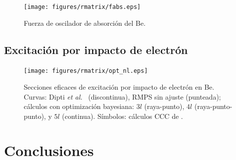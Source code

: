 \begin{figure}
\centering
\texttt{[image: figures/rmatrix/fabs.eps]} 
\caption{Fuerza de oscilador de absorción del Be.}
\label{fig:fabs}
\end{figure}

\newpage
\subsection{Excitación por impacto de electrón}


\begin{figure}
\centering
\texttt{[image: figures/rmatrix/opt\_nl.eps]} 
\caption[Secciones eficaces de excitación por impacto de electrón en Be.]
{Secciones eficaces de excitación por impacto de electrón en Be.
Curvas: Dipti \textit{et al.}~\cite{Dipti:19} (discontinua), RMPS sin 
ajuste (punteada); cálculos con optimización bayesiana: 
$3l$ (raya-punto), 
$4l$ (raya-punto-punto), y
$5l$ (continua). 
Símbolos: cálculos CCC de \cite{Fursa:97}.}
\end{figure}

\newpage
\section{Conclusiones}
